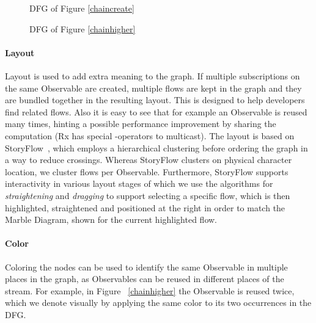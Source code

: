 \begin{figure}[ht]
    \centering
    
    \caption{DFG of Figure%
    \ref{chaincreate}}%
    \label{fiddlesimple}
\end{figure}

\begin{figure}[ht]
    \centering
    
    \caption{DFG of Figure%
    \ref{chainhigher}}%
    \label{fiddlehigher}
\end{figure}

\paragraph{Layout} Layout is used to add extra meaning to the graph.  If
multiple subscriptions on the same Observable are created, multiple
flows are kept in the graph and they are bundled together in the
resulting layout.  This is designed to help developers find related
flows.  Also it is easy to see that for example an Observable is reused
many times, hinting a possible performance improvement by sharing the
computation (Rx has special -operators to multicast).  The
layout is based on StoryFlow~\cite{liu2013storyflow}, which employs a
hierarchical clustering before ordering the graph in a way to reduce
crossings.  Whereas StoryFlow clusters on physical character location,
we cluster flows per Observable.  Furthermore, StoryFlow supports
interactivity in various layout stages of which we use the algorithms
for \emph{straightening} and \emph{dragging} to support selecting a
specific flow, which is then highlighted, straightened and positioned at
the right in order to match the Marble Diagram, shown for the current
highlighted flow.

\paragraph{Color} Coloring the nodes can be used to identify the same
Observable in multiple places in the graph, as Observables can be reused
in different places of the stream.  For example, in Figure~%
\ref{chainhigher} the  Observable is reused twice, which we
denote visually by applying the same color to its two occurrences in the
DFG.

